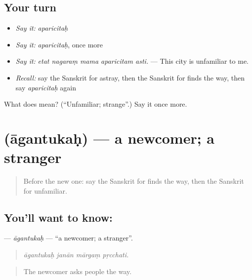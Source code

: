 \subsection*{Your turn}
\begin{itemize}
\raggedright
  \item \emph{Say it:} \emph{aparicitaḥ}
  \item \emph{Say it:} \emph{aparicitaḥ}, once more
  \item \emph{Say it:} \emph{etat nagaraṃ mama aparicitam asti.} — This city is unfamiliar to me.
  \item \emph{Recall:} say the Sanskrit for astray, then the Sanskrit for finds the way, then say \emph{aparicitaḥ} again
\end{itemize}

\begin{tcolorbox}[breakable,colback=teal!4,colframe=teal!35!black,title={Before you move on}]
What does  mean? (\textquotedblleft{}Unfamiliar; strange\textquotedblright{}.) Say it once more.
\end{tcolorbox}
\section[\texorpdfstring{\sk{आगन्तुकः} (āgantukaḥ)}{आगन्तुकः (āgantukaḥ)}]{ (āgantukaḥ) — a newcomer; a stranger}

\label{lesson:SA-C414-agantukah}



\begin{quote}
Before the new one: say the Sanskrit for finds the way, then the Sanskrit for unfamiliar.
\end{quote}

\subsection*{You'll want to know: }
\textbf{} — \emph{āgantukaḥ} — \textquotedblleft{}a newcomer; a stranger\textquotedblright{}.

\begin{quote}
   
\end{quote}

\begin{quote}
\emph{āgantukaḥ janān mārgaṃ pṛcchati.}
\end{quote}

\begin{quote}
The newcomer asks people the way.
\end{quote}


